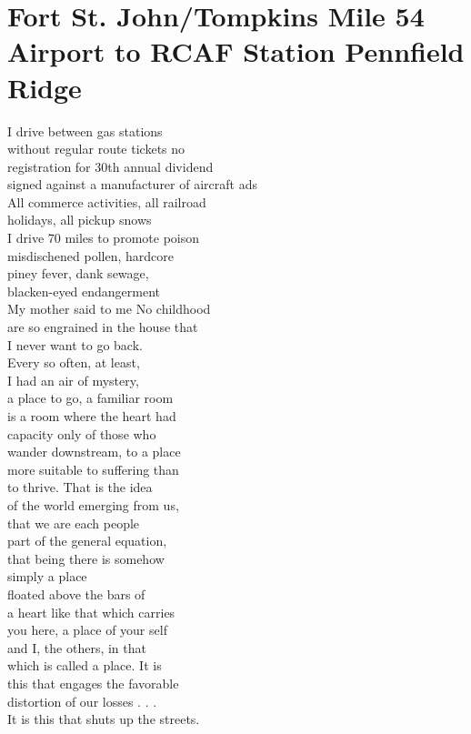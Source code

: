\documentclass[smalldemyvopaper,11pt,twoside,onecolumn,openright,extrafontsizes]{memoir}
\begin{document}
\chapter{Fort St. John/Tompkins Mile 54 Airport to RCAF Station Pennfield Ridge}
I drive between gas stations
\\without regular route tickets no
\\registration for 30th annual dividend
\\signed against a manufacturer of aircraft ads
\\All commerce activities, all railroad
\\holidays, all pickup snows
\\I drive 70 miles to promote poison
\\misdischened pollen, hardcore
\\piney fever, dank sewage,
\\blacken-eyed endangerment
\\My mother said to me No childhood
\\are so engrained in the house that
\\I never want to go back.
\\Every so often, at least,
\\I had an air of mystery,
\\a place to go, a familiar room
\\is a room where the heart had
\\capacity only of those who
\\wander downstream, to a place
\\more suitable to suffering than
\\to thrive.   That is the idea
\\of the world emerging from us,
\\that we are each people
\\part of the general equation,
\\that being there is somehow
\\simply a place
\\floated above the bars of
\\a heart like that which carries
\\you here, a place of your self
\\and I, the others, in that
\\which is called a place.   It is
\\this that engages the favorable
\\distortion of our losses . . .
\\It is this that shuts up the streets.
\end{document}

